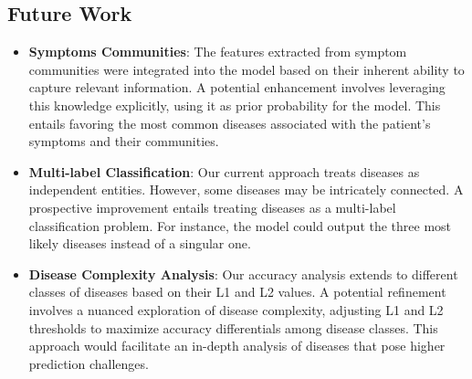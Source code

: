 \subsection{Future Work}

\begin{itemize}
\item \textbf{Symptoms Communities}: The features extracted from symptom communities were integrated into the model based on their 
inherent ability to capture relevant information. A potential enhancement involves leveraging this knowledge explicitly, using it as prior 
probability for the model. This entails favoring the most common diseases associated with the patient's symptoms and their communities.

\item \textbf{Multi-label Classification}: Our current approach treats diseases as independent entities. However, some diseases 
may be intricately connected. A prospective improvement entails treating diseases as a multi-label classification problem. 
For instance, the model could output the three most likely diseases instead of a singular one.

\item \textbf{Disease Complexity Analysis}: Our accuracy analysis extends to different classes of diseases based on their L1 and L2 values. 
A potential refinement involves a nuanced exploration of disease complexity, adjusting L1 and L2 thresholds to maximize accuracy 
differentials among disease classes. This approach would facilitate an in-depth analysis of diseases that pose higher prediction challenges.


\end{itemize}

